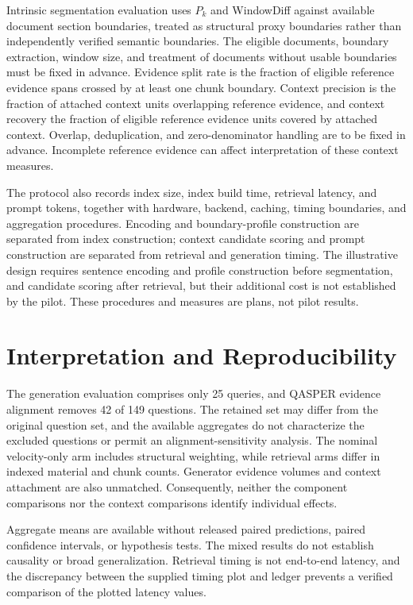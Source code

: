 \documentclass[10pt]{article}
\begin{document}
Intrinsic segmentation evaluation uses $P_k$ and WindowDiff against available document section boundaries, treated as structural proxy boundaries rather than independently verified semantic boundaries. The eligible documents, boundary extraction, window size, and treatment of documents without usable boundaries must be fixed in advance. Evidence split rate is the fraction of eligible reference evidence spans crossed by at least one chunk boundary. Context precision is the fraction of attached context units overlapping reference evidence, and context recovery the fraction of eligible reference evidence units covered by attached context. Overlap, deduplication, and zero-denominator handling are to be fixed in advance. Incomplete reference evidence can affect interpretation of these context measures.

The protocol also records index size, index build time, retrieval latency, and prompt tokens, together with hardware, backend, caching, timing boundaries, and aggregation procedures. Encoding and boundary-profile construction are separated from index construction; context candidate scoring and prompt construction are separated from retrieval and generation timing. The illustrative design requires sentence encoding and profile construction before segmentation, and candidate scoring after retrieval, but their additional cost is not established by the pilot. These procedures and measures are plans, not pilot results.

\section{Interpretation and Reproducibility}

The generation evaluation comprises only 25 queries, and QASPER evidence alignment removes 42 of 149 questions. The retained set may differ from the original question set, and the available aggregates do not characterize the excluded questions or permit an alignment-sensitivity analysis. The nominal velocity-only arm includes structural weighting, while retrieval arms differ in indexed material and chunk counts. Generator evidence volumes and context attachment are also unmatched. Consequently, neither the component comparisons nor the context comparisons identify individual effects.

Aggregate means are available without released paired predictions, paired confidence intervals, or hypothesis tests. The mixed results do not establish causality or broad generalization. Retrieval timing is not end-to-end latency, and the discrepancy between the supplied timing plot and ledger prevents a verified comparison of the plotted latency values.
\end{document}
